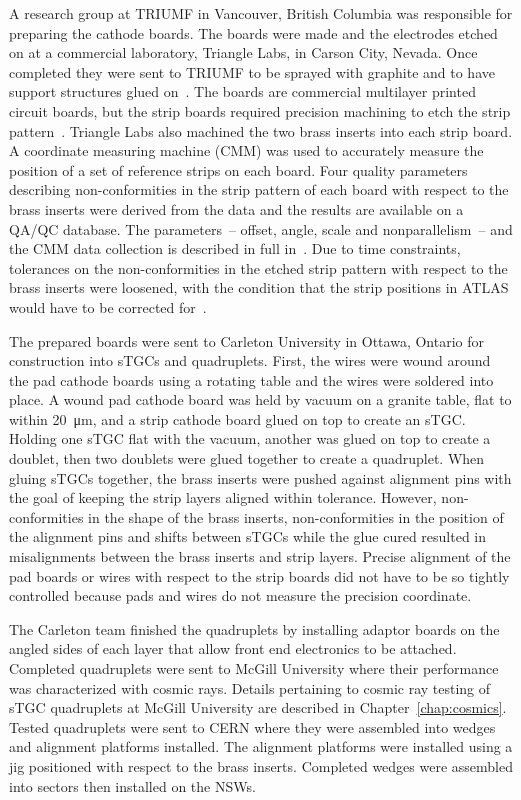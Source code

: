 A research group at TRIUMF in Vancouver, British Columbia was responsible for preparing the cathode boards. The boards were made and the electrodes etched on at a commercial laboratory, Triangle Labs, in Carson City, Nevada. Once completed they were sent to TRIUMF to be sprayed with graphite and to have support structures glued on~\cite{carlson_results_2019}. The boards are commercial multilayer printed circuit boards, but the strip boards required precision machining to etch the strip pattern~\cite{nsw_tdr}. Triangle Labs also machined the two brass inserts into each strip board. A coordinate measuring machine (CMM) was used to accurately measure the position of a set of reference strips on each board. Four quality parameters describing non-conformities in the strip pattern of each board with respect to the brass inserts were derived from the data and the results are available on a QA/QC database. The parameters~-- offset, angle, scale and nonparallelism~-- and the CMM data collection is described in full in~\cite{carlson_results_2019}.  Due to time constraints, tolerances on the non-conformities in the etched strip pattern with respect to the brass inserts were loosened, with the condition that the strip positions in ATLAS would have to be corrected for~\cite{carlson_results_2019}. 

The prepared boards were sent to Carleton University in Ottawa, Ontario for construction into sTGCs and quadruplets. First, the wires were wound around the pad cathode boards using a rotating table and the wires were soldered into place. A wound pad cathode board was held by vacuum on a granite table, flat to within \SI{20}{\micro\meter}, and a strip cathode board glued on top to create an sTGC. Holding one sTGC flat with the vacuum, another was glued on top to create a doublet, then two doublets were glued together to create a quadruplet. When gluing sTGCs together, the brass inserts were pushed against alignment pins with the goal of keeping the strip layers aligned within tolerance. However, non-conformities in the shape of the brass inserts, non-conformities in the position of the alignment pins and shifts between sTGCs while the glue cured resulted in misalignments between the brass inserts and strip layers. Precise alignment of the pad boards or wires with respect to the strip boards did not have to be so tightly controlled because pads and wires do not measure the precision coordinate. 

The Carleton team finished the quadruplets by installing adaptor boards on the angled sides of each layer that allow front end electronics to be attached. Completed quadruplets were sent to McGill University where their performance was characterized with cosmic rays. Details pertaining to cosmic ray testing of sTGC quadruplets at McGill University are described in Chapter~\ref{chap:cosmics}. Tested quadruplets were sent to CERN where they were assembled into wedges and alignment platforms installed. The alignment platforms were installed using a jig positioned with respect to the brass inserts. Completed wedges were assembled into sectors then installed on the NSWs.


